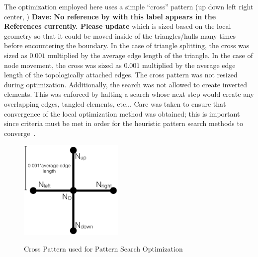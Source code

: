 The optimization employed here uses a simple ``cross'' pattern (up down
left right center, \cite{crossPattern}) {\bf{Dave:  No reference by
with this label appears in the References currently.  Please 
update}} which 
is sized based on the
local geometry so that it could be moved inside of the triangles/hulls
many times before encountering the boundary. In the case of triangle
splitting, the cross was sized as $0.001$ multiplied by the average edge
length of the triangle. In the case of node movement, the cross was
sized as $0.001$ multiplied by the average edge length of the
topologically attached edges. The cross pattern was not resized during
optimization.  Additionally, the search was not allowed to create
inverted elements.  This was enforced by halting a search whose next
step would create any overlapping edges, tangled elements, etc... Care
was taken to ensure that convergence of the local optimization method
was obtained; this is important since criteria must be met in order for
the heuristic pattern search methods to
converge~\cite{patternsearch2,patternsearch3}.

\begin{figure}
  \begin{center}
  \label{crossPattern}
  \includegraphics[width=50mm]{Figures/crossPattern.png}
  \caption{Cross Pattern used for Pattern Search Optimization}
  \end{center}
\end{figure}
